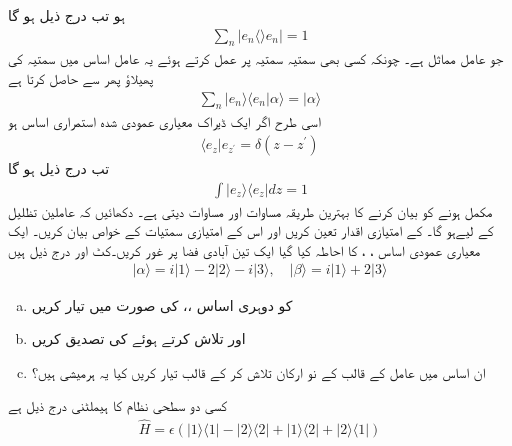 ہو تب درج ذیل ہو گا 
\begin{align}
\sum_{n} | e_{n} \langle \rangle e_{n} | = 1 
\end{align}
جو عامل مماثل ہے۔ چونکہ کسی بھی سمتیہ سمتیہ  پر عمل کرتے ہوئے یہ عامل اساس 
میں سمتیہ  کی پھیلاؤ پھر سے حاصل کرتا ہے 
\begin{align}
\sum_{n} | e_{n} \rangle \langle e_{n} | \alpha \rangle = | \alpha \rangle 
\end{align}
اسی طرح اگر  ایک ڈیراک معیاری عمودی شدہ استمراری اساس ہو 
\begin{align}
\langle e_{z} | e_{z^{'}} = \delta ( z-z^{'})
\end{align}
تب درج ذیل ہو گا 
\begin{align}
\int | e_{z} \rangle \langle e_{z} | dz = 1
\end{align}
مکمل ہونے کو بیان کرنے کا بہترین طریقہ مساوات  اور مساوات  دیتی ہے۔
دکھائیں کہ عاملین تظلیل کے لیےہو گا۔  کے امتیازی اقدار تعین کریں اور اس کے امتیازی سمتیات کے خواص  بیان کریں۔
 ایک معیاری عمودی اساس ،  ،  کا احاطہ کیا گیا ایک تین آبادی فضا پر غور کریں۔کٹ  اور  درج ذیل ہیں 
\begin{align*}
| \alpha \rangle = i | 1 \rangle -2|2\rangle -i|3\rangle , \quad | \beta \rangle = i|1\rangle +2|3\rangle 
\end{align*}
\begin{enumerate}[a.]
\item  {}    کو دوہری اساس  ،،  کی صورت میں تیار کریں 
\item  {} اور  تلاش کرتے ہوئے   کی تصدیق کریں
\item ان اساس میں عامل  کے قالب کے نو ارکان تلاش کر کے قالب  تیار کریں کیا یہ ہرمیشی ہیں؟
\end{enumerate} 
کسی دو سطحی نظام کا ہیملٹنی درج ذیل ہے 
\begin{align*}
\hat{H} = \epsilon ( | 1 \rangle \langle 1 | - |2\rangle \langle 2 | + | 1 \rangle \langle 2 | + | 2 \rangle \langle 1 | )
\end{align*}
